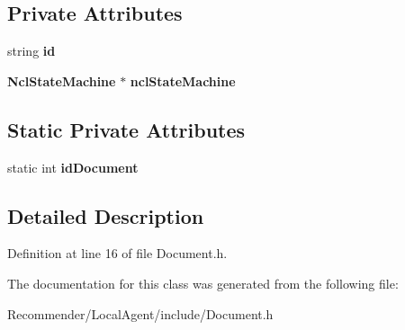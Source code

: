 \subsection*{Private Attributes}
\begin{CompactItemize}
\item 
string {\bf id}\label{classbr_1_1ufscar_1_1lince_1_1ginga_1_1recommender_1_1Document_d97b05b88ce9080f35b157cfacc8eb69}

\item 
{\bf NclStateMachine} $\ast$ {\bf nclStateMachine}\label{classbr_1_1ufscar_1_1lince_1_1ginga_1_1recommender_1_1Document_f8cd107d0aa3923a1c493049f8a4c861}

\end{CompactItemize}
\subsection*{Static Private Attributes}
\begin{CompactItemize}
\item 
static int {\bf idDocument}\label{classbr_1_1ufscar_1_1lince_1_1ginga_1_1recommender_1_1Document_5b7e47a923ee8e1b57b5ece0edc4585e}

\end{CompactItemize}


\subsection{Detailed Description}




Definition at line 16 of file Document.h.

The documentation for this class was generated from the following file:\begin{CompactItemize}
\item 
Recommender/LocalAgent/include/Document.h\end{CompactItemize}
